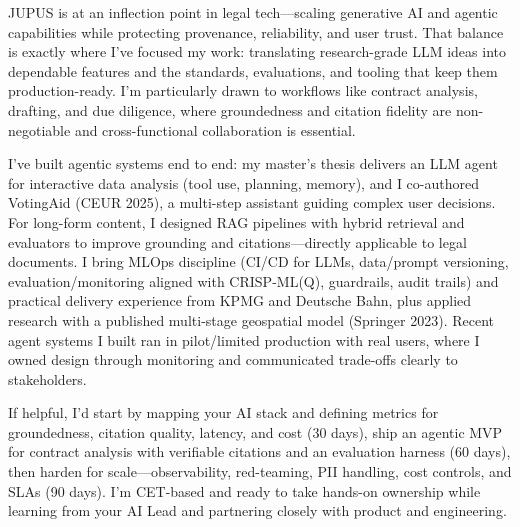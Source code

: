 JUPUS is at an inflection point in legal tech—scaling generative AI and agentic capabilities while protecting provenance, reliability, and user trust. That balance is exactly where I’ve focused my work: translating research-grade LLM ideas into dependable features and the standards, evaluations, and tooling that keep them production-ready. I’m particularly drawn to workflows like contract analysis, drafting, and due diligence, where groundedness and citation fidelity are non-negotiable and cross-functional collaboration is essential.

I’ve built agentic systems end to end: my master’s thesis delivers an LLM agent for interactive data analysis (tool use, planning, memory), and I co-authored VotingAid (CEUR 2025), a multi-step assistant guiding complex user decisions. For long-form content, I designed RAG pipelines with hybrid retrieval and evaluators to improve grounding and citations—directly applicable to legal documents. I bring MLOps discipline (CI/CD for LLMs, data/prompt versioning, evaluation/monitoring aligned with CRISP-ML(Q), guardrails, audit trails) and practical delivery experience from KPMG and Deutsche Bahn, plus applied research with a published multi-stage geospatial model (Springer 2023). Recent agent systems I built ran in pilot/limited production with real users, where I owned design through monitoring and communicated trade-offs clearly to stakeholders.

If helpful, I’d start by mapping your AI stack and defining metrics for groundedness, citation quality, latency, and cost (30 days), ship an agentic MVP for contract analysis with verifiable citations and an evaluation harness (60 days), then harden for scale—observability, red-teaming, PII handling, cost controls, and SLAs (90 days). I’m CET-based and ready to take hands-on ownership while learning from your AI Lead and partnering closely with product and engineering.